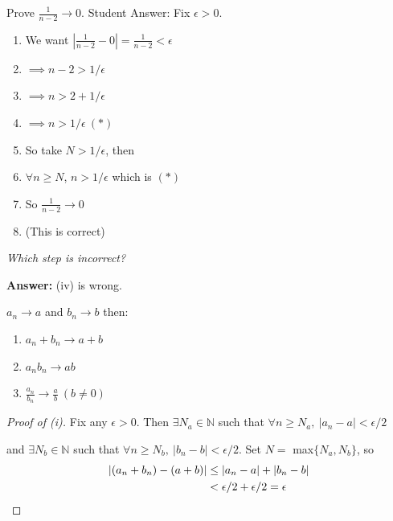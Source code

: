\documentclass[10pt,twoside]{scrartcl}
\begin{document}
\begin{clicker}
Prove $\frac{1}{n-2} \to 0$. Student Answer:
Fix $\epsilon >0$.
\begin{enumerate}
	\item We want $|\frac{1}{n-2} - 0| = \frac{1}{n-2} < \epsilon$
	\item $\implies n-2 > 1/\epsilon$
	\item $\implies n > 2 + 1/\epsilon$
	\item $\implies n > 1/\epsilon ~(*)$
	\item So take $N > 1/\epsilon$, then
	\item $\forall n \geq N$, $n > 1/\epsilon$ which is $(*)$
	\item So $\frac{1}{n-2} \to 0$
	\item (This is correct)
\end{enumerate}\vspace*{5pt}

\emph{Which step is incorrect?}

\textbf{Answer:} (iv) is wrong. 
	
\end{clicker}\vspace*{5pt}


\begin{theorem}\label{thm1}
$a_n \to a$ and $b_n \to b$ then:\begin{enumerate}
\item $a_n+b_n \to a+b$
\item $a_nb_n \to ab$
\item $\frac{a_n}{b_n} \to \frac{a}{b} ~(b \neq 0)$
\end{enumerate}
\end{theorem}
\begin{proof}[Proof of (i)]
Fix any $\epsilon >0$. Then $\exists N_a \in \mathbb{N}$ such that $\forall n\geq N_a,~ |a_n	 - a| < \epsilon/2$ 

and $\exists N_b \in \mathbb{N}$ such that $\forall n \geq N_b,~ |b_n - b| < \epsilon/2$. Set $N =$ max$\{N_a,N_b\}$, so 
\begin{align*}|(a_n + b_n) - (a+b)| &\leq |a_n -a| + |b_n -b| \\
	 &< \epsilon/2 + \epsilon/2 = \epsilon \qedhere
\end{align*}
\end{proof}
\end{document}

